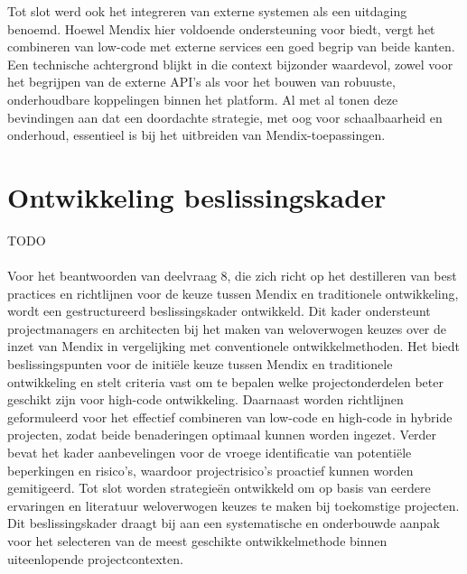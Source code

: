 Tot slot werd ook het integreren van externe systemen als een uitdaging benoemd. Hoewel Mendix hier voldoende ondersteuning voor biedt, vergt het combineren van low-code met externe services een goed begrip van beide kanten. Een technische achtergrond blijkt in die context bijzonder waardevol, zowel voor het begrijpen van de externe API’s als voor het bouwen van robuuste, onderhoudbare koppelingen binnen het platform. Al met al tonen deze bevindingen aan dat een doordachte strategie, met oog voor schaalbaarheid en onderhoud, essentieel is bij het uitbreiden van Mendix-toepassingen.

\section{Ontwikkeling beslissingskader}
TODO
\\
\\
Voor het beantwoorden van deelvraag 8, die zich richt op het destilleren van best practices en richtlijnen voor de keuze tussen Mendix en traditionele ontwikkeling, wordt een gestructureerd beslissingskader ontwikkeld. Dit kader ondersteunt projectmanagers en architecten bij het maken van weloverwogen keuzes over de inzet van Mendix in vergelijking met conventionele ontwikkelmethoden. Het biedt beslissingspunten voor de initiële keuze tussen Mendix en traditionele ontwikkeling en stelt criteria vast om te bepalen welke projectonderdelen beter geschikt zijn voor high-code ontwikkeling. Daarnaast worden richtlijnen geformuleerd voor het effectief combineren van low-code en high-code in hybride projecten, zodat beide benaderingen optimaal kunnen worden ingezet. Verder bevat het kader aanbevelingen voor de vroege identificatie van potentiële beperkingen en risico’s, waardoor projectrisico’s proactief kunnen worden gemitigeerd. Tot slot worden strategieën ontwikkeld om op basis van eerdere ervaringen en literatuur weloverwogen keuzes te maken bij toekomstige projecten. Dit beslissingskader draagt bij aan een systematische en onderbouwde aanpak voor het selecteren van de meest geschikte ontwikkelmethode binnen uiteenlopende projectcontexten.


